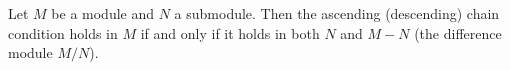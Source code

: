 Let $M$ be a module and $N$ a submodule. Then the ascending (descending) chain condition holds in $M$ if and only if it holds in both $N$ and $M - N$ (the difference module $M/N$).
